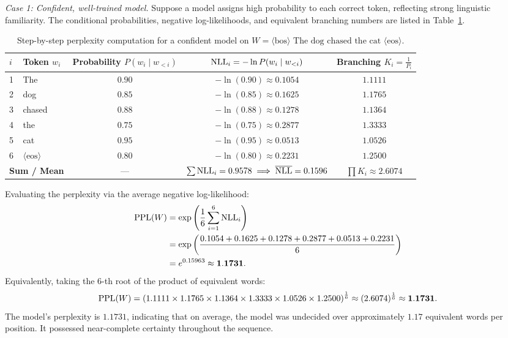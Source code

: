 \documentclass[../../main.tex]{subfiles}
\begin{document}
\textit{Case 1: Confident, well-trained model.}
Suppose a model assigns high probability to each correct token, reflecting strong linguistic familiarity. The conditional probabilities, negative log-likelihoods, and equivalent branching numbers are listed in Table~\ref{tab:perplexity_confident_example}.

\begin{table}[htbp]
\centering
\small
\caption{Step-by-step perplexity computation for a confident model on $W = \langle\text{bos}\rangle \text{ The dog chased the cat } \langle\text{eos}\rangle$.}
\label{tab:perplexity_confident_example}
\begin{tabular}{llccc}
\toprule
$i$ & Token $w_i$ & Probability $P(w_i \mid w_{<i})$ & $\mathrm{NLL}_i = -\ln P(w_i \mid w_{<i})$ & Branching $K_i = \frac{1}{P_i}$ \\
\midrule
1 & The & $0.90$ & $-\ln(0.90) \approx 0.1054$ & $1.1111$ \\
2 & dog & $0.85$ & $-\ln(0.85) \approx 0.1625$ & $1.1765$ \\
3 & chased & $0.88$ & $-\ln(0.88) \approx 0.1278$ & $1.1364$ \\
4 & the & $0.75$ & $-\ln(0.75) \approx 0.2877$ & $1.3333$ \\
5 & cat & $0.95$ & $-\ln(0.95) \approx 0.0513$ & $1.0526$ \\
6 & $\langle\text{eos}\rangle$ & $0.80$ & $-\ln(0.80) \approx 0.2231$ & $1.2500$ \\
\midrule
\multicolumn{2}{l}{\textbf{Sum / Mean}} & --- & $\sum \mathrm{NLL}_i = 0.9578 \implies \overline{\mathrm{NLL}} = 0.1596$ & $\prod K_i \approx 2.6074$ \\
\bottomrule
\end{tabular}
\end{table}

Evaluating the perplexity via the average negative log-likelihood:
\begin{align}
\mathrm{PPL}(W) &= \exp\left( \frac{1}{6} \sum_{i=1}^6 \mathrm{NLL}_i \right) \nonumber \\
        &= \exp\left( \frac{0.1054 + 0.1625 + 0.1278 + 0.2877 + 0.0513 + 0.2231}{6} \right) \nonumber \\
        &= e^{0.15963} \approx \mathbf{1.1731}.
\end{align}
Equivalently, taking the 6-th root of the product of equivalent words:
\begin{equation}
\mathrm{PPL}(W) = \left( 1.1111 \times 1.1765 \times 1.1364 \times 1.3333 \times 1.0526 \times 1.2500 \right)^{\frac{1}{6}} \approx (2.6074)^{\frac{1}{6}} \approx \mathbf{1.1731}.
\end{equation}
The model's perplexity is $1.1731$, indicating that on average, the model was undecided over approximately $1.17$ equivalent words per position. It possessed near-complete certainty throughout the sequence.
\end{document}
